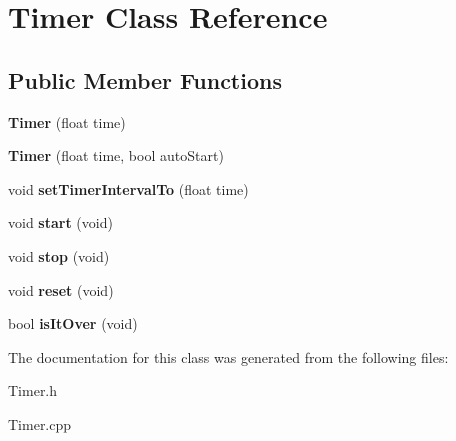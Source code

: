 \hypertarget{class_timer}{
\section{Timer Class Reference}
\label{class_timer}
}
\subsection*{Public Member Functions}
\begin{DoxyCompactItemize}
\item 
\hypertarget{class_timer_acec0fe002ab670bee63b3b2a2b4a6f3b}{
{\bfseries Timer} (float time)}
\label{class_timer_acec0fe002ab670bee63b3b2a2b4a6f3b}

\item 
\hypertarget{class_timer_a8433ea911b80ab72081c5372f1ff12f4}{
{\bfseries Timer} (float time, bool autoStart)}
\label{class_timer_a8433ea911b80ab72081c5372f1ff12f4}

\item 
\hypertarget{class_timer_a800f6357ad524a8d123bdd96a3b2c49f}{
void {\bfseries setTimerIntervalTo} (float time)}
\label{class_timer_a800f6357ad524a8d123bdd96a3b2c49f}

\item 
\hypertarget{class_timer_abb13e798f6d89b09fdc9182d64c7558b}{
void {\bfseries start} (void)}
\label{class_timer_abb13e798f6d89b09fdc9182d64c7558b}

\item 
\hypertarget{class_timer_ae377d8d11180abcee873d232b8fdd79e}{
void {\bfseries stop} (void)}
\label{class_timer_ae377d8d11180abcee873d232b8fdd79e}

\item 
\hypertarget{class_timer_a1e999699ea4c690c062dabd0b0373a6d}{
void {\bfseries reset} (void)}
\label{class_timer_a1e999699ea4c690c062dabd0b0373a6d}

\item 
\hypertarget{class_timer_aba0382310adafdcfa7a5b0a488571073}{
bool {\bfseries isItOver} (void)}
\label{class_timer_aba0382310adafdcfa7a5b0a488571073}

\end{DoxyCompactItemize}


The documentation for this class was generated from the following files:\begin{DoxyCompactItemize}
\item 
Timer.h\item 
Timer.cpp\end{DoxyCompactItemize}
